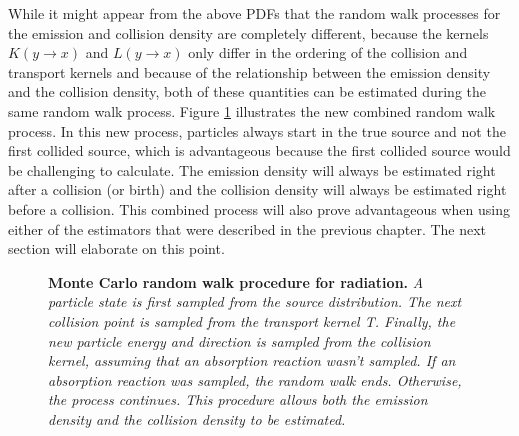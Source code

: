 While it might appear from the above PDFs that the random walk processes for
the emission and collision density are completely different, because the kernels
$K(y \to x)$ and $L(y \to x)$ only differ in the ordering of the collision and 
transport kernels and because of the relationship between the emission density 
and the collision density, both of these quantities can be estimated during the 
same random walk process. Figure \ref{fig:combined_random_walk_process} 
illustrates the new combined random walk process. In this new process, 
particles always start in the true source and not the first collided source, 
which is advantageous because the first collided source would be challenging to 
calculate. The emission density will always be estimated right after a collision
(or birth) and the collision density will always be estimated right before a 
collision. This combined process will also prove advantageous when using either 
of the estimators that were described in the previous chapter. The next section 
will elaborate on this point.
\begin{figure}[t!]
  \begin{center}
    \end{center}
  \caption{\textbf{Monte Carlo random walk procedure for radiation.}
    \textit{A particle state is first sampled from the source distribution. The
      next collision point is sampled from the transport kernel T. Finally,
      the new particle energy and direction is sampled from the collision
      kernel, assuming that an absorption reaction wasn't sampled. If an
      absorption reaction was sampled, the random walk ends. Otherwise, the
      process continues. This procedure allows both the emission density and 
      the collision density to be estimated.}}
  \label{fig:combined_random_walk_process}
\end{figure}

